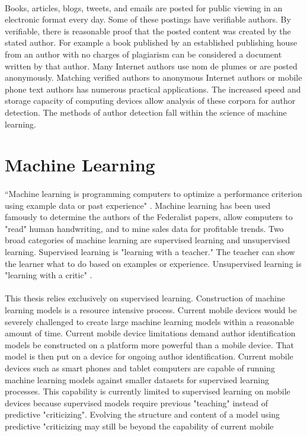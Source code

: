 	\paragraph{} Books, articles, blogs, tweets, and emails are posted for public viewing in an electronic format every day.  Some of these postings have verifiable authors.  By verifiable, there is reasonable proof that the posted content was created by the stated author.  For example a book published by an established publishing house from an author with no charges of plagiarism can be considered a document written by that author. Many Internet authors use nom de plumes or are posted anonymously.  Matching verified authors to anonymous Internet authors or mobile phone text authors has numerous practical applications. The increased speed and storage capacity of computing devices allow analysis of these corpora for author detection. The methods of author detection fall within the science of machine learning.

\section {Machine Learning}
	\paragraph{}``Machine learning is programming computers to optimize a performance criterion using example data or past experience" \cite{alpaydin_introduction_2004}.  Machine learning has been used famously to determine the authors of the Federalist papers, allow computers to "read" human handwriting, and to mine sales data for profitable trends.  Two broad categories of machine learning are supervised learning and unsupervised learning.  Supervised learning is "learning with a teacher."  The teacher can show the learner what to do based on examples or experience. Unsupervised learning is "learning with a critic" \cite{alpaydin_introduction_2004}. 
	\paragraph{} This thesis relies exclusively on supervised learning. Construction of machine learning models is a resource intensive process.  Current mobile devices would be severely challenged to create large machine learning models within a reasonable amount of time. Current mobile device limitations demand author identification models be constructed on a platform more powerful than a mobile device.  That model is then put on a device for ongoing author identification. Current mobile devices such as smart phones and tablet computers are capable of running machine learning models against smaller datasets for supervised learning processes. This capability is currently limited to supervised learning on mobile devices because supervised  models require previous "teaching" instead of predictive "criticizing".  Evolving the structure and content of a model using predictive "criticizing may still be beyond the capability of current mobile 

